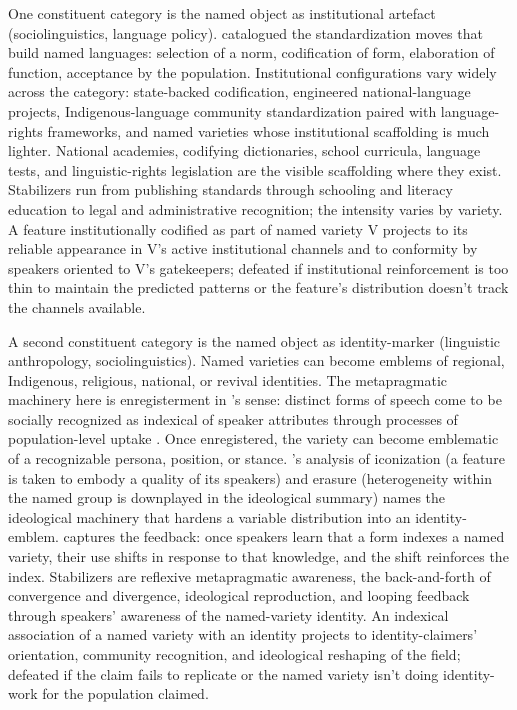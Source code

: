 \documentclass[12pt]{article}
\begin{document}
One constituent category is the named object as institutional artefact (sociolinguistics, language policy). \textcite{haugen1966} catalogued the standardization moves that build named languages: selection of a norm, codification of form, elaboration of function, acceptance by the population. Institutional configurations vary widely across the category: state-backed codification, engineered national-language projects, Indigenous-language community standardization paired with language-rights frameworks, and named varieties whose institutional scaffolding is much lighter. National academies, codifying dictionaries, school curricula, language tests, and linguistic-rights legislation are the visible scaffolding where they exist. Stabilizers run from publishing standards through schooling and literacy education to legal and administrative recognition; the intensity varies by variety. A feature institutionally codified as part of named variety V projects to its reliable appearance in V's active institutional channels and to conformity by speakers oriented to V's gatekeepers; defeated if institutional reinforcement is too thin to maintain the predicted patterns or the feature's distribution doesn't track the channels available.

A second constituent category is the named object as identity-marker (linguistic anthropology, sociolinguistics). Named varieties can become emblems of regional, Indigenous, religious, national, or revival identities. The metapragmatic machinery here is enregisterment in \citeauthor{agha2005}'s sense: distinct forms of speech come to be socially recognized as indexical of speaker attributes through processes of population-level uptake \citep{agha2005}. Once enregistered, the variety can become emblematic of a recognizable persona, position, or stance. \textcite{irvinegal2000}'s analysis of iconization (a feature is taken to embody a quality of its speakers) and erasure (heterogeneity within the named group is downplayed in the ideological summary) names the ideological machinery that hardens a variable distribution into an identity-emblem. \textcite{hacking1999} captures the feedback: once speakers learn that a form indexes a named variety, their use shifts in response to that knowledge, and the shift reinforces the index. Stabilizers are reflexive metapragmatic awareness, the back-and-forth of convergence and divergence, ideological reproduction, and looping feedback through speakers' awareness of the named-variety identity. An indexical association of a named variety with an identity projects to identity-claimers' orientation, community recognition, and ideological reshaping of the field; defeated if the claim fails to replicate or the named variety isn't doing identity-work for the population claimed.
\end{document}
